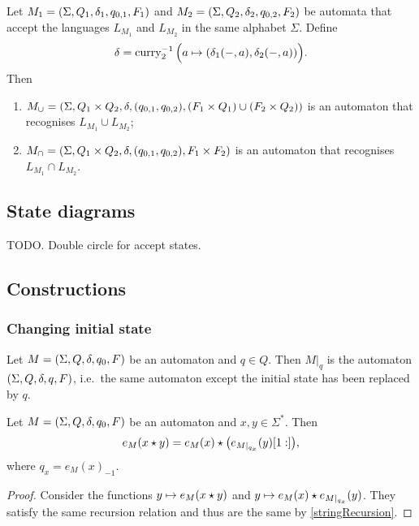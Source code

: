 \begin{proposition}
Let $M_1 = \sSet{\Sigma, Q_1, \delta_1, q_{0,1}, F_1}$ and $M_2 = \sSet{\Sigma, Q_2, \delta_2, q_{0,2}, F_2}$ be automata that accept the languages $L_{M_1}$ and $L_{M_2}$ in the same alphabet $\Sigma$. Define
\[ \delta = \operatorname{curry}_2^{-1}\Big(a\mapsto (\delta_1(-, a), \delta_2(-, a))\Big). \]
Then
\begin{enumerate}
\item $M_{\cup} = \sSet{\Sigma, Q_1\times Q_2, \delta, (q_{0,1}, q_{0,2}), (F_1\times Q_1) \cup (F_2\times Q_2)}$ is an automaton that recognises $L_{M_1}\cup L_{M_2}$;
\item $M_{\cap} = \sSet{\Sigma, Q_1\times Q_2, \delta, (q_{0,1}, q_{0,2}), F_1 \times F_2}$ is an automaton that recognises $L_{M_1}\cap L_{M_2}$.
\end{enumerate}
\end{proposition}

\subsection{State diagrams}
TODO. Double circle for accept states.

\subsection{Constructions}
\subsubsection{Changing initial state}
\begin{definition}
Let $M = \sSet{\Sigma, Q, \delta, q_{0}, F}$ be an automaton and $q\in Q$. Then $M|_{q}$ is the automaton $\sSet{\Sigma, Q, \delta, q, F}$, i.e.\ the same automaton except the initial state has been replaced by $q$.
\end{definition}

\begin{lemma} \label{automatonRunFactorisation}
Let $M = \sSet{\Sigma, Q, \delta, q_{0}, F}$ be an automaton and $x,y\in \Sigma^*$. Then
\[ e_M(x \star y) = e_M(x)\star \big(e_{M|_{q_x}}(y)[1:]\big), \]
where $q_x = e_M(x)_{-1}$.
\end{lemma}
\begin{proof}
Consider the functions $y\mapsto e_M(x \star y)$ and $y\mapsto e_M(x)\star e_{M|_{q_x}}(y)$. They satisfy the same recursion relation and thus are the same by \ref{stringRecursion}.
\end{proof}

